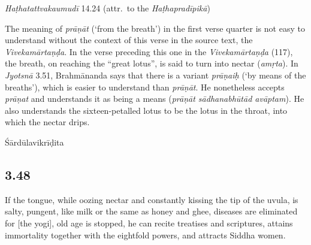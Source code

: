 \begin{ekdosis}
\begin{testimonia}[hp03_047]
\emph{Haṭhatattvakaumudī} 14.24 (attr.~to the \emph{Haṭhapradīpikā})
\begin{versinnote}
\tl{\var{ūrdhvaṃ ] mūrdhvaṃ \vl}\\!}
\end{versinnote}
\end{testimonia}

\begin{philcomm}[hp03_047]
The meaning of \emph{prāṇāt} (`from the breath') in the first verse quarter is not easy to understand without the context of this verse in the source text, the \emph{Vivekamārtaṇḍa}. In the verse preceding this one in the \emph{Vivekamārtaṇḍa} (117), the breath, on reaching the “great lotus”, is said to turn into nectar (\emph{amṛta}). In \emph{Jyotsnā} 3.51, Brahmānanda says that there is a variant \emph{prāṇaiḥ} (`by means of the breaths'), which is easier to understand than \emph{prāṇāt}. He nonetheless accepts \emph{prāṇat} and understands it as being a means (\emph{prāṇāt sādhanabhūtād avāptam}). He also understands the sixteen-petalled lotus to be the lotus in the throat, into which the nectar drips.
\end{philcomm}

\begin{metre}[hp03_047]
Śārdūlavikrīḍita 
\end{metre}

\subsection*{3.48}
\begin{translation}[hp03_048]
If the tongue, while oozing nectar and constantly kissing the tip of the uvula, is salty, pungent, like  milk or the same as honey and ghee, diseases are eliminated for [the yogi], old age is stopped, he can recite treatises and scriptures, attains immortality together with the eightfold powers, and attracts Siddha women.
\end{translation}


\end{ekdosis}

